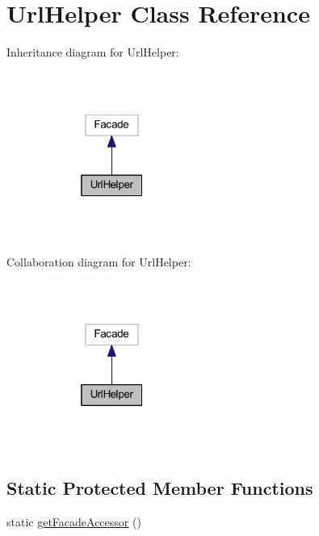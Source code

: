 \hypertarget{classhamburgscleanest_1_1_data_tables_1_1_facades_1_1_url_helper}{}\section{Url\+Helper Class Reference}
\label{classhamburgscleanest_1_1_data_tables_1_1_facades_1_1_url_helper}


Inheritance diagram for Url\+Helper\+:
\nopagebreak
\begin{figure}[H]
\begin{center}
\leavevmode
\includegraphics[width=136pt]{classhamburgscleanest_1_1_data_tables_1_1_facades_1_1_url_helper__inherit__graph}
\end{center}
\end{figure}


Collaboration diagram for Url\+Helper\+:
\nopagebreak
\begin{figure}[H]
\begin{center}
\leavevmode
\includegraphics[width=136pt]{classhamburgscleanest_1_1_data_tables_1_1_facades_1_1_url_helper__coll__graph}
\end{center}
\end{figure}
\subsection*{Static Protected Member Functions}
\begin{DoxyCompactItemize}
\item 
static \hyperlink{classhamburgscleanest_1_1_data_tables_1_1_facades_1_1_url_helper_a19a808201f41f32f71a0532cb49b450f}{get\+Facade\+Accessor} ()
\end{DoxyCompactItemize}


